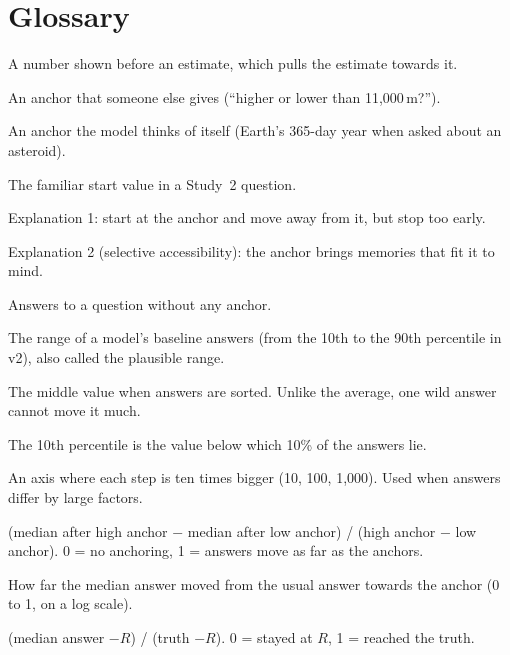 \documentclass[11pt,a4paper]{article}
\begin{document}
\clearpage
\appendix

\section{Glossary}
\label{app:glossary}

\begin{description}[style=nextline,leftmargin=0.5cm,itemsep=3pt]
  \item[Anchor] A number shown before an estimate, which pulls the estimate towards it.
  \item[Provided anchor] An anchor that someone else gives (``higher or lower than 11,000\,m?'').
  \item[Self-generated anchor] An anchor the model thinks of itself (Earth's 365-day year when asked about an asteroid).
  \item[Reference value $R$] The familiar start value in a Study~2 question.
  \item[Adjusting] Explanation 1: start at the anchor and move away from it, but stop too early.
  \item[Retrieving] Explanation 2 (selective accessibility): the anchor brings memories that fit it to mind.
  \item[Baseline] Answers to a question without any anchor.
  \item[Normal zone] The range of a model's baseline answers (from the 10th to the 90th percentile in v2), also called the plausible range.
  \item[Median] The middle value when answers are sorted. Unlike the average, one wild answer cannot move it much.
  \item[Percentile] The 10th percentile is the value below which 10\% of the answers lie.
  \item[Logarithmic axis] An axis where each step is ten times bigger (10, 100, 1,000). Used when answers differ by large factors.
  \item[Anchoring index] (median after high anchor $-$ median after low anchor) / (high anchor $-$ low anchor). 0 = no anchoring, 1 = answers move as far as the anchors.
  \item[Shift] How far the median answer moved from the usual answer towards the anchor (0 to 1, on a log scale).
  \item[Adjustment] (median answer $-R$) / (truth $-R$). 0 = stayed at $R$, 1 = reached the truth.

\end{description}
\end{document}
